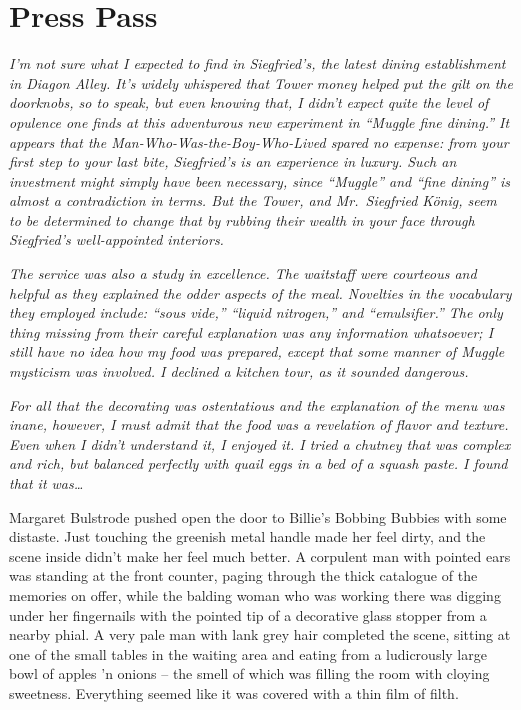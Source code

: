 \hypertarget{press-pass}{%
\chapter{Press Pass}\label{press-pass}}

\emph{I'm not sure what I expected to find in Siegfried's, the latest
dining establishment in Diagon Alley. It's widely whispered that Tower
money helped put the gilt on the doorknobs, so to speak, but even
knowing that, I didn't expect quite the level of opulence one finds at
this adventurous new experiment in ``Muggle fine dining.'' It appears
that the Man-Who-Was-the-Boy-Who-Lived spared no expense: from your
first step to your last bite, Siegfried's is an experience in luxury.
Such an investment might simply have been necessary, since ``Muggle''
and ``fine dining'' is almost a contradiction in terms. But the Tower,
and Mr.~Siegfried König, seem to be determined to change that by rubbing
their wealth in your face through Siegfried's well-appointed interiors.}

\emph{The service was also a study in excellence. The waitstaff were
courteous and helpful as they explained the odder aspects of the meal.
Novelties in the vocabulary they employed include: ``sous vide,''
``liquid nitrogen,'' and ``emulsifier.'' The only thing missing from
their careful explanation was any information whatsoever; I still have
no idea how my food was prepared, except that some manner of Muggle
mysticism was involved. I declined a kitchen tour, as it sounded
dangerous.}

\emph{For all that the decorating was ostentatious and the explanation
of the menu was inane, however, I must admit that the food was a
revelation of flavor and texture. Even when I didn't understand it, I
enjoyed it. I tried a chutney that was complex and rich, but balanced
perfectly with quail eggs in a bed of a squash paste. I found that it
was\ldots{}}\\


\mybreak

Margaret Bulstrode pushed open the door to Billie's Bobbing Bubbies with
some distaste. Just touching the greenish metal handle made her feel
dirty, and the scene inside didn't make her feel much better. A
corpulent man with pointed ears was standing at the front counter,
paging through the thick catalogue of the memories on offer, while the
balding woman who was working there was digging under her fingernails
with the pointed tip of a decorative glass stopper from a nearby phial.
A very pale man with lank grey hair completed the scene, sitting at one
of the small tables in the waiting area and eating from a ludicrously
large bowl of apples 'n onions -- the smell of which was filling the
room with cloying sweetness. Everything seemed like it was covered with
a thin film of filth.


